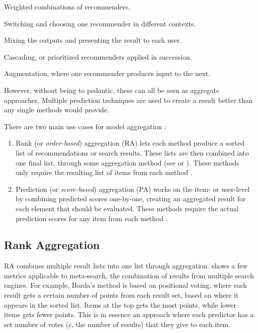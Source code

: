 \begin{itemize*}
  \item Weighted combinations of recommenders.
  \item Switching and choosing one recommender in different contexts.
  \item Mixing the outputs and presenting the result to each user.
  \item Cascading, or prioritized recommenders applied in succession.
  \item Augmentation, where one recommender produces input to the next.
\end{itemize*}

However, without being to pedantic, these can all be seen as aggregate approaches. Multiple prediction techniques are used
to create a result better than any single methods would provide.

There are two main use cases for model aggregation \cite{Liu2007}: 

\begin{enumerate}
  \item Rank (or \emph{order-based}) aggregation (RA) lets each method
  produce a sorted list of recommendations or search results. These lists are then combined
  into one final list, through some aggregation method (see \cite{Dwork2001} or \cite{Klementiev2008}).
  These methods only require the resulting list of items from each method \cite{Aslam2001}.

  \item Prediction (or \emph{score-based}) aggregation (PA) works on the item- or user-level by combining predicted scores
  one-by-one, creating an aggregated result for each element that should be evaluated.
  These methods require the actual prediction scores for any item from each method \cite[p2]{Aslam2001}.
\end{enumerate}

\subsection{Rank Aggregation}
\label{sec:theory:rank}

RA combines multiple result lists into one list through aggregation.
\cite{Dwork2001} shows a few metrics applicable to meta-search, the combination of results from multiple search engines.
For example, Borda's method \cite[p6]{Dwork2001} is based on positional voting, where each result gets a certain number of points from each result set,
based on where it appears in the sorted list. Items at the top gets the most points, while lower items gets fewer points.
This is in essence an approach where each predictor has a set number of votes ($c$, the number of results) that they give to each item.

